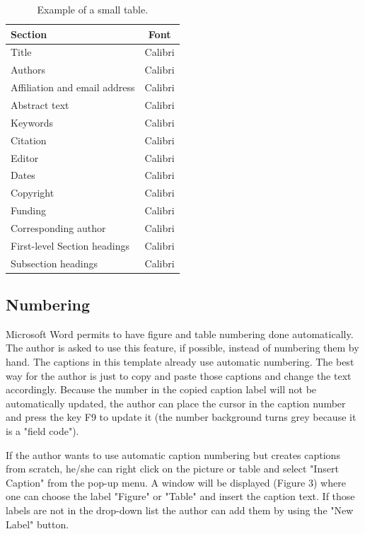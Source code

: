 \documentclass[10pt]{../imeko_acta}
\begin{document}
\begin{table}[!b]
	\caption{Example of a small table.}
	\label{tab:tab2}
	\centering
\begin{tabularx}{\columnwidth}{lC}
	\toprule
	Section & Font \\
	\midrule
	Title & Calibri \\
	Authors & Calibri \\
	Affiliation and email address & Calibri \\
	Abstract text & Calibri \\
	Keywords & Calibri \\
	Citation & Calibri \\
	Editor & Calibri \\
	Dates & Calibri \\
	Copyright & Calibri \\
	Funding & Calibri \\
	Corresponding author & Calibri \\
	First-level Section headings  & Calibri \\
	Subsection headings & Calibri \\
	\bottomrule
\end{tabularx}
\end{table}

\subsection{Numbering}

Microsoft Word permits to have figure and table numbering done automatically. The author is asked to use this feature, if possible, instead of numbering them by hand. The captions in this template already use automatic numbering. The best way for the author is just to copy and paste those captions and change the text accordingly. Because the number in the copied caption label will not be automatically updated, the author can place the cursor in the caption number and press the key F9 to update it (the number background turns grey because it is a "field code").

If the author wants to use automatic caption numbering but creates captions from scratch, he/she can right click on the picture or table and select "Insert Caption" from the pop-up menu. A window will be displayed (Figure 3) where one can choose the label "Figure" or "Table" and insert the caption text. If those labels are not in the drop-down list the author can add them by using the "New Label" button.
\end{document}
